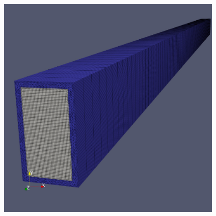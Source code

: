 \documentclass[10pt,xcolor={dvipsnames,table},aspectratio=169]{beamer}
\begin{document}
\begin{frame}{}
\begin{minipage}{0.45\linewidth}
\begin{figure}
                \includegraphics[scale=0.08]{mesh2}
            \end{figure}
        \end{minipage}

    \end{frame}
    
%
%
%
%
\end{document}
